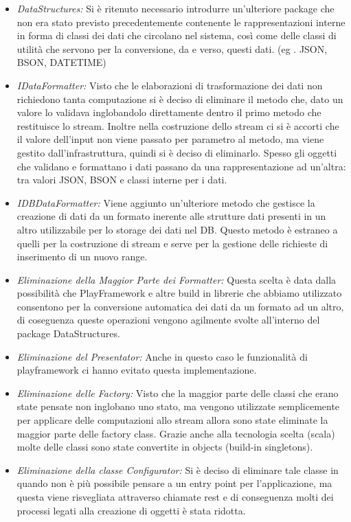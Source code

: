 \begin{itemize}
  \item \textit{DataStructures:} Si \`e ritenuto necessario introdurre un'ulteriore package che non era stato previsto precedentemente contenente le rappresentazioni interne in forma di classi dei dati che circolano nel sistema, cos\`i come delle classi di utilit\`a che servono per la conversione, da e verso, questi dati. (eg . JSON, BSON, DATETIME)
  \item \textit{IDataFormatter:} Visto che le elaborazioni di trasformazione dei dati non richiedono tanta computazione si \`e deciso di eliminare il metodo che, dato un valore lo validava inglobandolo direttamente dentro il primo metodo che restituisce lo stream. Inoltre nella costruzione dello stream ci si \`e accorti che il valore dell'input non viene passato per parametro al metodo, ma viene gestito dall'infrastruttura, quindi si \`e deciso di eliminarlo. Spesso gli oggetti che validano e formattano i dati passano da una rappresentazione ad un'altra: tra valori JSON, BSON e classi interne per i dati.
  \item \textit{IDBDataFormatter:} Viene aggiunto un'ulteriore metodo che gestisce la creazione di dati da un formato inerente alle strutture dati presenti in un altro utilizzabile per lo storage dei dati nel DB. Questo metodo \`e estraneo a quelli per la costruzione di stream e serve per la gestione delle richieste di inserimento di un nuovo range.
  \item \textit{Eliminazione della Maggior Parte dei Formatter:} Questa scelta \`e data dalla possibilit\`a che PlayFramework e altre build in librerie che abbiamo utilizzato consentono per la conversione automatica dei dati da un formato ad un altro, di coseguenza queste operazioni vengono agilmente svolte all'interno del package DataStructures.
  \item \textit{Eliminazione del Presentator:} Anche in questo caso le funzionalit\`a di playframework ci hanno evitato questa implementazione.
  \item \textit{Eliminazione delle Factory:} Visto che la maggior parte delle classi che erano state pensate non inglobano uno stato, ma vengono utilizzate semplicemente per applicare delle computazioni allo stream allora sono state eliminate la maggior parte delle factory class. Grazie anche alla tecnologia scelta (scala) molte delle classi sono state convertite in objects (build-in singletons).
  \item \textit{Eliminazione della classe Configurator:} Si \`e deciso di eliminare tale classe in quando non \`e pi\`u possibile pensare a un entry point per l'applicazione, ma questa viene risvegliata attraverso chiamate rest e di conseguenza molti dei processi legati alla creazione di oggetti \`e stata ridotta.

\end{itemize}
